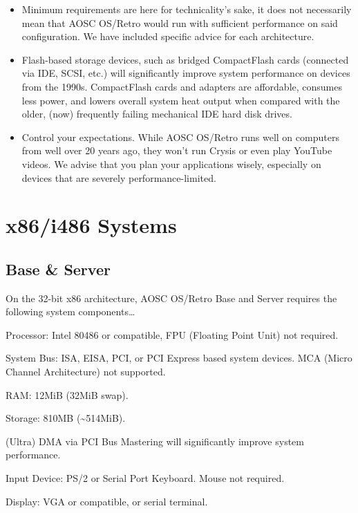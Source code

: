     \begin{itemize}
        \item Minimum requirements are here for technicality's sake,
            it does not necessarily mean that AOSC OS/Retro would run with sufficient performance
            on said configuration. We have included specific advice for each architecture.
        \item Flash-based storage devices, such as bridged CompactFlash cards
            (connected via IDE, SCSI, etc.) will significantly improve system performance on devices from the 1990s.
            CompactFlash cards and adapters are affordable, consumes less power,
            and lowers overall system heat output when compared with the older,
            (now) frequently failing mechanical IDE hard disk drives.
        \item Control your expectations. While AOSC OS/Retro runs well on computers from well over 20 years ago,
            they won't run Crysis or even play YouTube videos. We advise that you plan your applications wisely,
            especially on devices that are severely performance-limited.
    \end{itemize}


    \section{x86/i486 Systems}

    \subsection{Base \& Server}

    On the 32-bit x86 architecture, AOSC OS/Retro Base and Server requires the following system components\ldots

    \begin{compactitem}
        \item Processor: Intel 80486 or compatible, FPU (Floating Point Unit) not required.
        \item System Bus: ISA, EISA, PCI, or PCI Express based system devices. MCA (Micro Channel Architecture) not supported.
        \item RAM: 12MiB (32MiB swap).
        \item Storage: 810MB ({\textasciitilde}514MiB).
            \begin{compactitem}
                \item (Ultra) DMA via PCI Bus Mastering will significantly improve system performance.
            \end{compactitem}
        \item Input Device: PS/2 or Serial Port Keyboard. Mouse not required.
        \item Display: VGA or compatible, or serial terminal.
    \end{compactitem}

